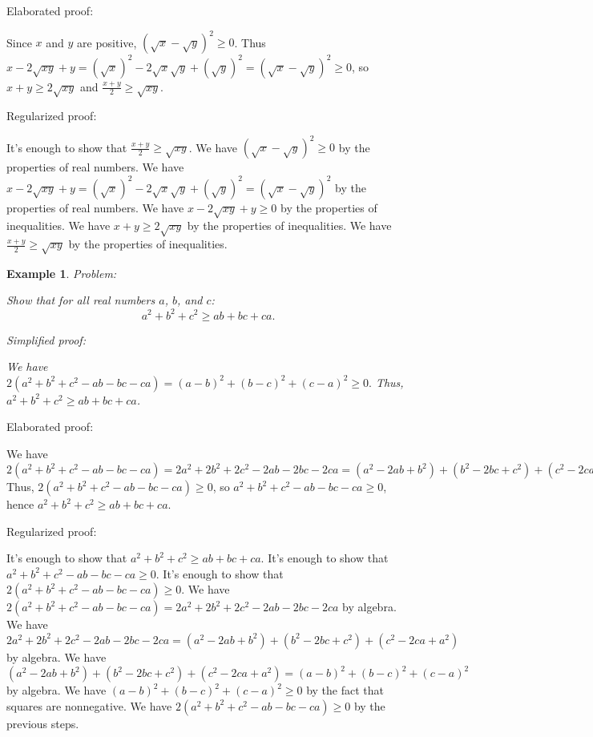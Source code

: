 \documentclass{article}
\newtheorem{example}{Example}
\begin{document}
Elaborated proof:
\begin{tcolorbox}[colback=green!10, width=\linewidth]
Since $x$ and $y$ are positive, $(\sqrt x - \sqrt y)^2 \ge 0$. Thus $x - 2\sqrt{xy} + y = (\sqrt{x})^2 - 2\sqrt{x}\sqrt{y} + (\sqrt{y})^2 = (\sqrt x - \sqrt y)^2 \ge 0$, so $x+y \ge 2\sqrt{xy}$ and $\frac{x+y}{2} \ge \sqrt{xy}$.
\end{tcolorbox}

Regularized proof:
\begin{tcolorbox}[colback=red!10, width=\linewidth]
It's enough to show that $\frac{x+y}{2} \geq \sqrt{xy}$.
We have $(\sqrt{x} - \sqrt{y})^2 \geq 0$ by the properties of real numbers.
We have $x - 2\sqrt{xy} + y = (\sqrt{x})^2 - 2\sqrt{x}\sqrt{y} + (\sqrt{y})^2 = (\sqrt{x} - \sqrt{y})^2$ by the properties of real numbers.
We have $x - 2\sqrt{xy} + y \geq 0$ by the properties of inequalities.
We have $x + y \geq 2\sqrt{xy}$ by the properties of inequalities.
We have $\frac{x+y}{2} \geq \sqrt{xy}$ by the properties of inequalities.
\end{tcolorbox}



\begin{example}
Problem:
\begin{tcolorbox}[colback=yellow!10, width=\linewidth]
Show that for all real numbers $a$, $b$, and $c$:
    $$a^2 + b^2 + c^2 \geq ab + bc + ca.$$
\end{tcolorbox}

Simplified proof:
\begin{tcolorbox}[colback=blue!10, width=\linewidth]
We have
$ 2(a^2 + b^2 + c^2 - ab - bc - ca) = (a-b)^2 + (b-c)^2 + (c-a)^2 \ge 0. $
Thus, $a^2 + b^2 + c^2 \ge ab + bc + ca$.
\end{tcolorbox}
\end{example}

Elaborated proof:
\begin{tcolorbox}[colback=green!10, width=\linewidth]
We have
$ 2(a^2 + b^2 + c^2 - ab - bc - ca) = 2a^2 + 2b^2 + 2c^2 - 2ab - 2bc - 2ca = (a^2 - 2ab + b^2) + (b^2 - 2bc + c^2) + (c^2 - 2ca + a^2) = (a-b)^2 + (b-c)^2 + (c-a)^2 \ge 0. $
Thus, $2(a^2 + b^2 + c^2 - ab - bc - ca) \ge 0$, so $a^2 + b^2 + c^2 - ab - bc - ca \ge 0$, hence $a^2 + b^2 + c^2 \ge ab + bc + ca$.
\end{tcolorbox}

Regularized proof:
\begin{tcolorbox}[colback=red!10, width=\linewidth]
It's enough to show that $a^2 + b^2 + c^2 \ge ab + bc + ca$.
It's enough to show that $a^2 + b^2 + c^2 - ab - bc - ca \ge 0$.
It's enough to show that $2(a^2 + b^2 + c^2 - ab - bc - ca) \ge 0$.
We have $2(a^2 + b^2 + c^2 - ab - bc - ca) = 2a^2 + 2b^2 + 2c^2 - 2ab - 2bc - 2ca$ by algebra.
We have $2a^2 + 2b^2 + 2c^2 - 2ab - 2bc - 2ca = (a^2 - 2ab + b^2) + (b^2 - 2bc + c^2) + (c^2 - 2ca + a^2)$ by algebra.
We have $(a^2 - 2ab + b^2) + (b^2 - 2bc + c^2) + (c^2 - 2ca + a^2) = (a-b)^2 + (b-c)^2 + (c-a)^2$ by algebra.
We have $(a-b)^2 + (b-c)^2 + (c-a)^2 \ge 0$ by the fact that squares are nonnegative.
We have $2(a^2 + b^2 + c^2 - ab - bc - ca) \ge 0$ by the previous steps.
\end{tcolorbox}
\end{document}
